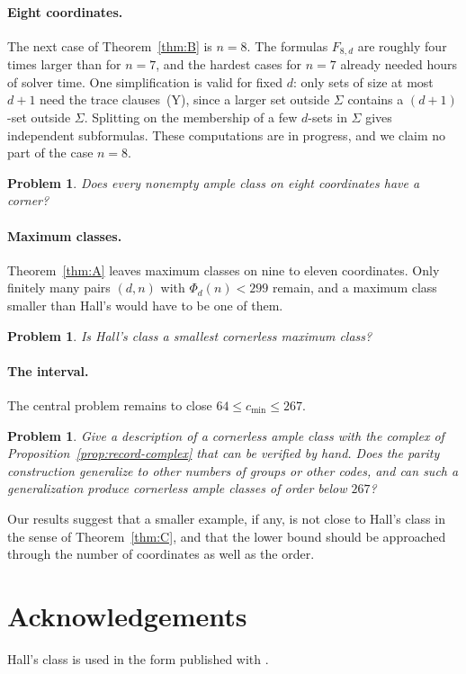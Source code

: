 \documentclass[11pt]{article}
\numberwithin{equation}{section}
\newtheorem{problem}[theorem]{Problem}
\theoremstyle{definition}
\theoremstyle{remark}
\newcommand{\cmin}{c_{\min}}
\begin{document}
\paragraph{Eight coordinates.}
The next case of Theorem~\ref{thm:B} is \(n=8\).  The formulas \(F_{8,d}\)
are roughly four times larger than for \(n=7\), and the hardest cases for
\(n=7\) already needed hours of solver time.  One simplification is valid
for fixed \(d\): only sets of size at most \(d+1\) need the trace
clauses~(Y), since a larger set outside \(\Sigma\) contains a
\((d+1)\)-set outside \(\Sigma\).  Splitting on the membership of a few
\(d\)-sets in \(\Sigma\) gives independent subformulas.  These computations
are in progress, and we claim no part of the case \(n=8\).

\begin{problem}
Does every nonempty ample class on eight coordinates have a corner?
\end{problem}

\paragraph{Maximum classes.}
Theorem~\ref{thm:A} leaves maximum classes on nine to eleven coordinates.
Only finitely many pairs \((d,n)\) with \(\Phi_d(n)<299\) remain, and a
maximum class smaller than Hall's would have to be one of them.

\begin{problem}
Is Hall's class a smallest cornerless maximum class?
\end{problem}

\paragraph{The interval.}
The central problem remains to close \(64\le\cmin\le267\).

\begin{problem}
Give a description of a cornerless ample class with the complex of
Proposition~\ref{prop:record-complex} that can be verified by hand.  Does the
parity construction generalize to other numbers of groups or other
codes, and can such a generalization produce cornerless ample classes of
order below \(267\)?
\end{problem}  Our results
suggest that a smaller example, if any, is not close to Hall's class in the
sense of Theorem~\ref{thm:C}, and that the lower bound should be approached
through the number of coordinates as well as the order.

\section*{Acknowledgements}
Hall's class is used in the form published with
\cite{ChalopiChepoiMoran22}.



\end{document}
